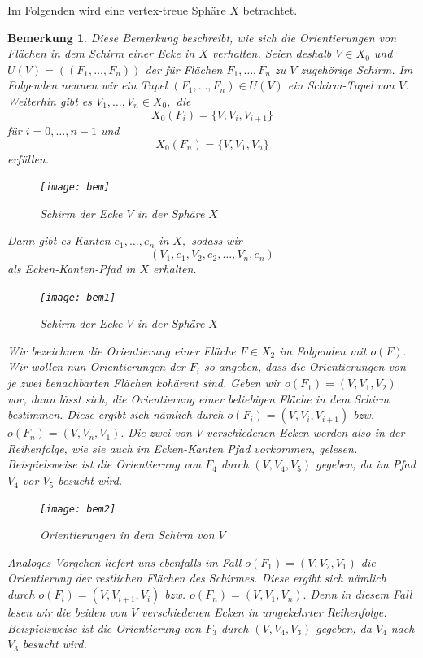\documentclass[12pt,titlepage,twoside,cleardoublepage]{article}
\theoremstyle{nummermitklammern}
\newtheorem{bemerkung}[temp]{Bemerkung}
\newtheorem{bemerkung}[zahl]{Bemerkung}
\numberwithin{equation}{section}
\begin{document}
Im Folgenden wird eine vertex-treue Sphäre $X$ betrachtet.
\begin{bemerkung}\label{tup}
Diese Bemerkung beschreibt, wie sich die Orientierungen von Flächen in dem Schirm einer Ecke in $X$ verhalten.
 Seien deshalb $V\in X_0$ und $U(V)=((F_1,\ldots,F_n))$ der für Flächen $F_1,\ldots,F_n$ zu $V$ zugehörige Schirm. Im Folgenden nennen wir ein Tupel $(F_1,\ldots,F_n)\in U(V)$ ein \emph{Schirm-Tupel} von $V$. Weiterhin gibt es $V_1,\ldots,V_n\in X_0,$ die 
\[
X_0(F_i)=\{V,V_i,V_{i+1}\}
\] 
für $i=0,\ldots,n-1$ und 
\[
X_0(F_n)=\{V,V_{1},V_{n}\}
\] erfüllen.
\begin{figure}[H]
\begin{center}
\texttt{[image: bem]}
\end{center}
\caption{Schirm der Ecke $V$ in der Sphäre $X$}
\end{figure}
Dann gibt es Kanten $e_1,\ldots,e_n$ in $X,$ sodass wir 
\[
(V_1,e_1,V_2,e_2,\ldots,V_n,e_n)
\] 
als Ecken-Kanten-Pfad in $X$ erhalten. 
\begin{figure}[H]
\begin{center}
\texttt{[image: bem1]}
\end{center}
\caption{Schirm der Ecke $V$ in der Sphäre $X$}
\end{figure}
Wir bezeichnen die Orientierung einer Fläche $F\in X_2$ im Folgenden mit $o(F).$ Wir wollen nun Orientierungen der $F_i$ so angeben, dass die Orientierungen von je zwei benachbarten Flächen kohärent sind. 
Geben wir $o(F_1)=(V,V_1,V_2)$ vor, dann lässt sich, die Orientierung einer beliebigen Fläche in dem Schirm bestimmen. Diese ergibt sich nämlich durch $o(F_i)=(V,V_i,V_{i+1})$ bzw. $o(F_n)=(V,V_n,V_1).$ Die zwei von $V$ verschiedenen Ecken werden also in der Reihenfolge, wie sie auch im Ecken-Kanten Pfad vorkommen, gelesen. Beispielsweise ist die Orientierung von $F_4$ durch $(V,V_4,V_5)$ gegeben, da im Pfad $V_4$ vor $V_5 $ besucht wird. 
\begin{figure}[H]
\begin{center}
\texttt{[image: bem2]}
\end{center}
\caption{Orientierungen in dem Schirm von $V$}
\end{figure}
Analoges Vorgehen liefert uns ebenfalls im Fall $o(F_1)=(V,V_2,V_1)$ die Orientierung der restlichen Flächen des Schirmes. Diese ergibt sich nämlich durch $o(F_i)=(V,V_{i+1},V_{i})$ bzw. $o(F_n)=(V,V_1,V_n).$ Denn in diesem Fall lesen wir die beiden von $V$ verschiedenen Ecken in umgekehrter Reihenfolge. Beispielsweise ist die Orientierung von $F_3$ durch $(V,V_4,V_3)$ gegeben, da $V_4$ nach $V_3$ besucht wird.

\end{bemerkung}
\end{document}
